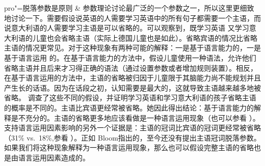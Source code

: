 pro"=脱落参数是原则 \& 参数理论讨论最广泛的一个参数之一，所以这里更细致地讨论一下。需要假设说英语的人需要学习英语中的所有句子都需要一个主语，而说意大利语的人需要学习主语是可以省略的。可以观察到，既学习英语 又学习意大利语的儿童也会省略主语（实际上德国儿童也是如此）。省略宾语的情况比省略主语的情况更常见。对于这种现象有两种可能的解释：一是基于语言能力的，一是基于语言运用 的。在基于语言能力的方法中，假设儿童使用一种语法，允许他们省略主语并且后来才习得正确的语法（通过设置参数或者增加规则装置）。相反，在基于语言运用的方法中，主语的省略被归因于儿童限于其脑能力尚不能规划并且产生长的话语。因为在话段之初，认知需要是最大的，这就导致主语越来越多地被省略。  \citet{Valian91a}调查了这些不同的假设，并证明学习英语和学习意大利语的孩子省略主语的概率是不同的。主语比宾语更经常被省略。她因此得出结论：基于语言能力的解释是不充分的。主语的省略更多地应该看做是一种语言运用现象（也可以参看 \citealp{Bloom93a}）。支持语言运用因素影响的另外一个证据是：主语的冠词比宾语的冠词更经常被省略（31\% vs.\ 18\%,参看 \citealp[]{Gerken91a}）。正如 Bloom指出的，至今还没有提出主语冠词脱落参数。如果我们将这种现象解释为一种语言运用现象，那么也可以假设完整主语的省略也是由语言运用因素造成的。
